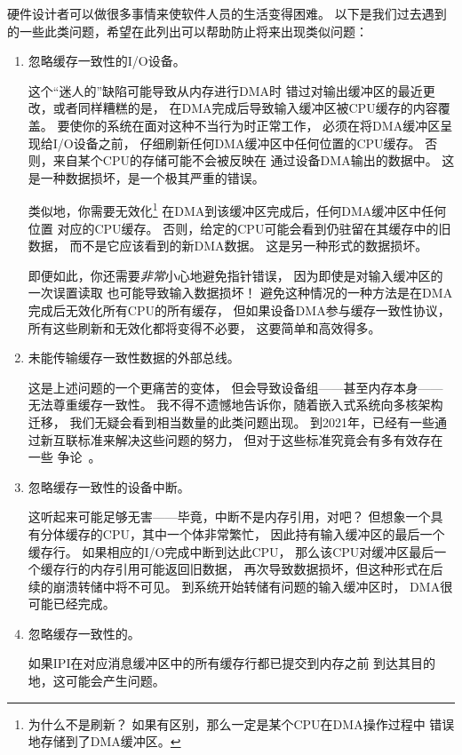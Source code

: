 硬件设计者可以做很多事情来使软件人员的生活变得困难。
以下是我们过去遇到的一些此类问题，希望在此列出可以帮助防止将来出现类似问题：
\begin{enumerate}
\item	忽略缓存一致性的I/O设备。

	这个``迷人的''缺陷可能导致从内存进行DMA时
	错过对输出缓冲区的最近更改，或者同样糟糕的是，
	在DMA完成后导致输入缓冲区被CPU缓存的内容覆盖。
	要使你的系统在面对这种不当行为时正常工作，
	必须在将DMA缓冲区呈现给I/O设备之前，
	仔细刷新任何DMA缓冲区中任何位置的CPU缓存。
	否则，来自某个CPU的存储可能不会被反映在
	通过设备DMA输出的数据中。
	这是一种数据损坏，是一个极其严重的错误。

	类似地，你需要无效化\footnote{
		为什么不是刷新？
		如果有区别，那么一定是某个CPU在DMA操作过程中
		错误地存储到了DMA缓冲区。}
	在DMA到该缓冲区完成后，任何DMA缓冲区中任何位置
	对应的CPU缓存。
	否则，给定的CPU可能会看到仍驻留在其缓存中的旧数据，
	而不是它应该看到的新DMA数据。
	这是另一种形式的数据损坏。

	即便如此，你还需要\emph{非常}小心地避免指针错误，
	因为即使是对输入缓冲区的一次误置读取
	也可能导致输入数据损坏！
	避免这种情况的一种方法是在DMA完成后无效化所有CPU的所有缓存，
	但如果设备DMA参与缓存一致性协议，
	所有这些刷新和无效化都将变得不必要，
	这要简单和高效得多。

\item	未能传输缓存一致性数据的外部总线。

	这是上述问题的一个更痛苦的变体，
	但会导致设备组——甚至内存本身——
	无法尊重缓存一致性。
	我不得不遗憾地告诉你，随着嵌入式系统向多核架构迁移，
	我们无疑会看到相当数量的此类问题出现。
	到2021年，已经有一些通过新互联标准来解决这些问题的努力，
	但对于这些标准究竟会有多有效存在一些
	争论~\cite{WilliamGWong2019CCIX-CXL}。

\item	忽略缓存一致性的设备中断。

	这听起来可能足够无害——毕竟，中断不是内存引用，对吧？
	但想象一个具有分体缓存的CPU，其中一个体非常繁忙，
	因此持有输入缓冲区的最后一个缓存行。
	如果相应的I/O完成中断到达此CPU，
	那么该CPU对缓冲区最后一个缓存行的内存引用可能返回旧数据，
	再次导致数据损坏，但这种形式在后续的崩溃转储中将不可见。
	到系统开始转储有问题的输入缓冲区时，
	DMA很可能已经完成。

\item	忽略缓存一致性的。

	如果IPI在对应消息缓冲区中的所有缓存行都已提交到内存之前
	到达其目的地，这可能会产生问题。


\end{enumerate}
